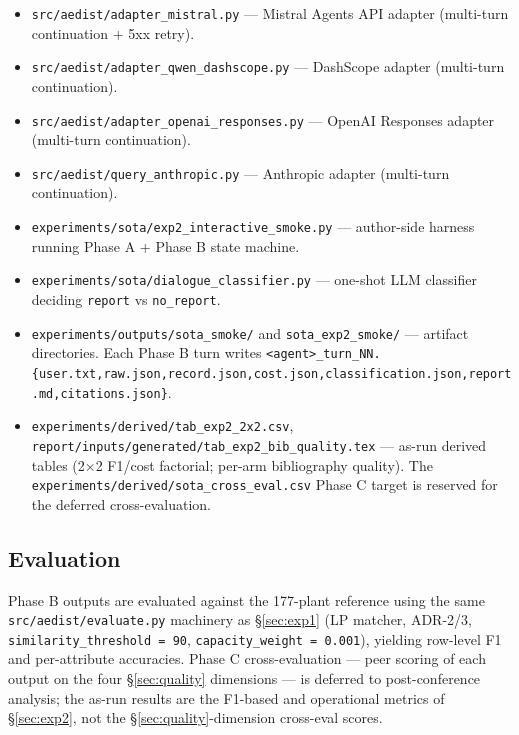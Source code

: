 \documentclass[a4paper,11pt]{article}
\providecommand{\tightlist}{%
  \setlength{\itemsep}{0pt}\setlength{\parskip}{0pt}}
\begin{document}
\begin{itemize}
\tightlist
\item
  \texttt{src/aedist/adapter\_mistral.py} --- Mistral Agents API adapter
  (multi-turn continuation + 5xx retry).
\item
  \texttt{src/aedist/adapter\_qwen\_dashscope.py} --- DashScope adapter
  (multi-turn continuation).
\item
  \texttt{src/aedist/adapter\_openai\_responses.py} --- OpenAI Responses
  adapter (multi-turn continuation).
\item
  \texttt{src/aedist/query\_anthropic.py} --- Anthropic adapter
  (multi-turn continuation).
\item
  \texttt{experiments/sota/exp2\_interactive\_smoke.py} --- author-side
  harness running Phase A + Phase B state machine.
\item
  \texttt{experiments/sota/dialogue\_classifier.py} --- one-shot LLM
  classifier deciding \texttt{report} vs \texttt{no\_report}.
\item
  \texttt{experiments/outputs/sota\_smoke/} and
  \texttt{sota\_exp2\_smoke/} --- artifact directories. Each Phase B
  turn writes
  \texttt{\textless{}agent\textgreater{}\_turn\_NN.\{user.txt,raw.json,record.json,cost.json,classification.json,report.md,citations.json\}}.
\item
  \texttt{experiments/derived/tab\_exp2\_2x2.csv},
  \texttt{report/inputs/generated/tab\_exp2\_bib\_quality.tex} ---
  as-run derived tables (2×2 F1/cost factorial; per-arm bibliography
  quality). The \texttt{experiments/derived/sota\_cross\_eval.csv} Phase
  C target is reserved for the deferred cross-evaluation.
\end{itemize}

\subsection*{Evaluation}

Phase B outputs are evaluated against the 177-plant reference using the
same \texttt{src/aedist/evaluate.py} machinery as §\ref{sec:exp1} (LP
matcher, ADR-2/3, \texttt{similarity\_threshold\ =\ 90},
\texttt{capacity\_weight\ =\ 0.001}), yielding row-level F1 and
per-attribute accuracies. Phase C cross-evaluation --- peer scoring of
each output on the four §\ref{sec:quality} dimensions --- is deferred to
post-conference analysis; the as-run results are the F1-based and
operational metrics of §\ref{sec:exp2}, not the
§\ref{sec:quality}-dimension cross-eval scores.
\end{document}
